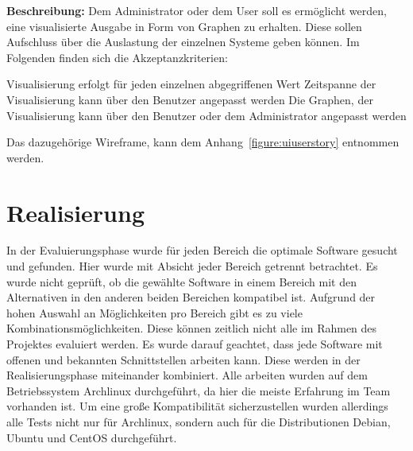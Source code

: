 {\textbf{Beschreibung:} Dem Administrator oder dem User soll es ermöglicht
werden, eine visualisierte Ausgabe in Form von Graphen zu erhalten. Diese
sollen Aufschluss über die Auslastung der einzelnen Systeme geben können. Im
Folgenden finden sich die Akzeptanzkriterien:

\begin{outline}
  \1 Visualisierung erfolgt für jeden einzelnen abgegriffenen Wert
  \1 Zeitspanne der Visualisierung kann über den Benutzer angepasst werden
  \1 Die Graphen, der Visualisierung kann über den Benutzer oder dem
  Administrator angepasst werden
\end{outline}

Das dazugehörige Wireframe, kann dem Anhang~\ref{figure:uiuserstory}
entnommen werden.
\mr%

\chapter{Realisierung}
In der Evaluierungsphase wurde für jeden Bereich die optimale Software gesucht
und gefunden. Hier wurde mit Absicht jeder Bereich getrennt betrachtet. Es
wurde nicht geprüft, ob die gewählte Software in einem Bereich mit den
Alternativen in den anderen beiden Bereichen kompatibel ist. Aufgrund der hohen
Auswahl an Möglichkeiten pro Bereich gibt es zu viele
Kombinationsmöglichkeiten. Diese können zeitlich nicht alle im Rahmen des
Projektes evaluiert werden. Es wurde darauf geachtet, dass jede Software mit
offenen und bekannten Schnittstellen arbeiten kann. Diese werden in der
Realisierungsphase miteinander kombiniert. Alle arbeiten wurden auf dem
Betriebssystem Archlinux durchgeführt, da hier die meiste Erfahrung im Team
vorhanden ist. Um eine große Kompatibilität sicherzustellen wurden allerdings
alle Tests nicht nur für Archlinux, sondern auch für die Distributionen Debian,
Ubuntu und CentOS durchgeführt.

}
